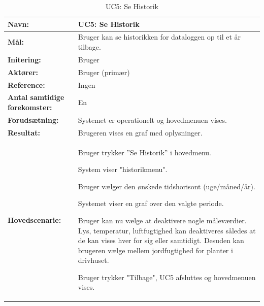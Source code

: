 \begin{table}[h]
\begin{tabularx}{\textwidth}{| >{\raggedright\arraybackslash}p{3.3 cm} | >{\raggedright\arraybackslash}X |} \hline

\textbf{Navn:} 						& UC5: Se Historik\\ \hline
\textbf{Mål:}						& Bruger kan se historikken for dataloggen op til et år tilbage. \\ \hline
\textbf{Initering:}					& Bruger \\ \hline
\textbf{Aktører:} 					& Bruger (primær) \\ \hline
\textbf{Reference:} 					& Ingen \\ \hline
\textbf{Antal samtidige forekomster:} & En \\ \hline
\textbf{Forudsætning:} 				& Systemet er operationelt og hovedmenuen vises. \\ \hline
\textbf{Resultat:}					& Brugeren vises en graf med oplysninger. \\ \hline
\textbf{Hovedscenarie:}				& 

\begin{packed_enum}
\item Bruger trykker ”Se Historik” i hovedmenu.
\item System viser "historikmenu". 
\item Bruger vælger den ønskede tidshorisont (uge/måned/år).
\item Systemet viser en graf over den valgte periode.
\item Bruger kan nu vælge at deaktivere nogle måleværdier. Lys, temperatur, luftfugtighed kan deaktiveres således at de kan vises hver for sig eller samtidigt. Desuden kan brugeren vælge mellem jordfugtighed for planter i drivhuset.
\item Bruger trykker "Tilbage", UC5 afsluttes og hovedmenuen vises.
\end{packed_enum} \\ \hline
\end{tabularx}
\caption{UC5: Se Historik}
\label{tbl:UC5}
\end{table}

\clearpage

